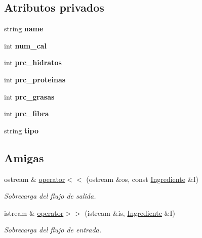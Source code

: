 \subsection*{Atributos privados}
\begin{DoxyCompactItemize}
\item 
\mbox{\label{classIngrediente_a32fb2d01b40a3ca84ce9b99f6f25d456}} 
string {\bfseries name}
\item 
\mbox{\label{classIngrediente_af7f0e4c9b4dcdb4cf5d586e48f6aa2c8}} 
int {\bfseries num\+\_\+cal}
\item 
\mbox{\label{classIngrediente_ab0760444575b8e4852c055ee5bc1ab0e}} 
int {\bfseries prc\+\_\+hidratos}
\item 
\mbox{\label{classIngrediente_ad47b30c4af3d45c59f32bd6c458e6bb2}} 
int {\bfseries prc\+\_\+proteinas}
\item 
\mbox{\label{classIngrediente_ad12287d60e39a5bc6828eca5bc592399}} 
int {\bfseries prc\+\_\+grasas}
\item 
\mbox{\label{classIngrediente_ab846da4bf702320bf99faeece8738b56}} 
int {\bfseries prc\+\_\+fibra}
\item 
\mbox{\label{classIngrediente_a44f6a782f64fbb3777faed251ca50127}} 
string {\bfseries tipo}
\end{DoxyCompactItemize}
\subsection*{Amigas}
\begin{DoxyCompactItemize}
\item 
ostream \& \hyperlink{classIngrediente_a8eb17567275c9321807798349e3e3f28}{operator$<$$<$} (ostream \&os, const \hyperlink{classIngrediente}{Ingrediente} \&I)
\begin{DoxyCompactList}\small\item\em Sobrecarga del flujo de salida. \end{DoxyCompactList}\item 
istream \& \hyperlink{classIngrediente_a99ca935915d4c00d502b976cf4b9f4df}{operator$>$$>$} (istream \&is, \hyperlink{classIngrediente}{Ingrediente} \&I)
\begin{DoxyCompactList}\small\item\em Sobrecarga del flujo de entrada. \end{DoxyCompactList}\end{DoxyCompactItemize}



